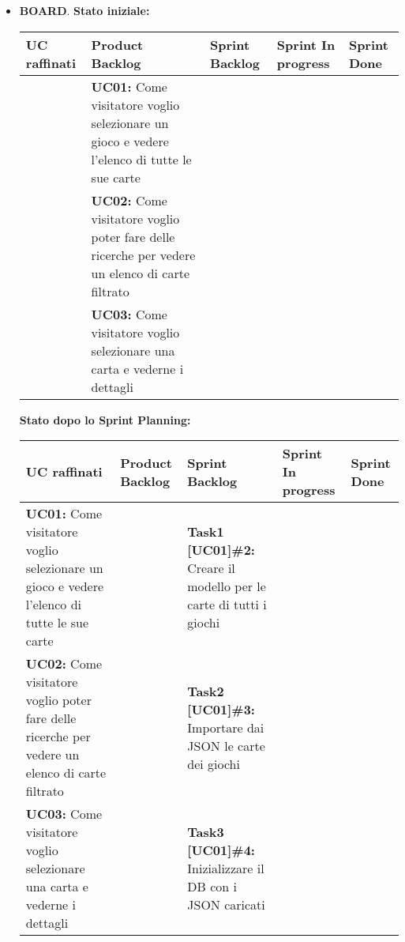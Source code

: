 \documentclass{article}
\begin{document}
    \begin{itemize}
        \item \textbf{BOARD}.
        \newline
        \textbf{Stato iniziale:}
        \newline
        \newline
        \begin{tabular}{ | p{2.5cm} | p{4cm} | p{2.6cm} | p{1.6cm} | p{1.6cm} | }
            \hline
            \textbf{UC raffinati}
            & \textbf{Product Backlog}
            & \textbf{Sprint Backlog}
            & \textbf{Sprint In progress}
            & \textbf{Sprint Done} \\
            \hline
            & \textbf{UC01:} Come visitatore voglio selezionare un gioco e vedere l'elenco di tutte le sue carte & & & \\
            \hline
            & \textbf{UC02:} Come visitatore voglio poter fare delle ricerche per vedere un elenco di carte filtrato & & & \\
            \hline
            & \textbf{UC03:} Come visitatore voglio selezionare una carta e vederne i dettagli & & & \\
            \hline
        \end{tabular}
        \newpage
        \textbf{Stato dopo lo Sprint Planning:}
        \newline
        \newline
        \begin{tabular}{ | p{3.5cm} | p{1.5cm} | p{5cm} | p{1.6cm} | p{1.6cm} | }
            \hline
            \textbf{UC raffinati}
            & \textbf{Product Backlog}
            & \textbf{Sprint Backlog}
            & \textbf{Sprint In progress}
            & \textbf{Sprint Done} \\
            \hline
            \textbf{UC01:} Come visitatore voglio selezionare un gioco e vedere l'elenco di tutte le sue carte
            & & \textbf{Task1 [UC01]\#2:} Creare il modello per le carte di tutti i giochi & & \\
            \hline
            \textbf{UC02:} Come visitatore voglio poter fare delle ricerche per vedere un elenco di carte filtrato
            & & \textbf{Task2 [UC01]\#3:} Importare dai JSON le carte dei giochi & & \\
            \hline
            \textbf{UC03:} Come visitatore voglio selezionare una carta e vederne i dettagli
            & & \textbf{Task3 [UC01]\#4:} Inizializzare il DB con i JSON caricati & & \\

\end{tabular}
\end{itemize}
\end{document}
